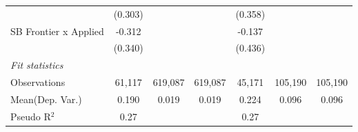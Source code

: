 \begin{tabular}{lcccccc}
                         & (0.303)       &         &         & (0.358)       &         &   \\   
   SB Frontier x Applied & -0.312        &         &         & -0.137        &         &   \\   
                         & (0.340)       &         &         & (0.436)       &         &   \\   
   \midrule
   \emph{Fit statistics}\\
   Observations          & 61,117        & 619,087 & 619,087 & 45,171        & 105,190 & 105,190\\  
Mean(Dep. Var.) & 0.190 & 0.019 & 0.019 & 0.224 & 0.096 & 0.096 \\
   Pseudo R$^2$          & 0.27          &         &         & 0.27          &         & \\  
   

\end{tabular}

